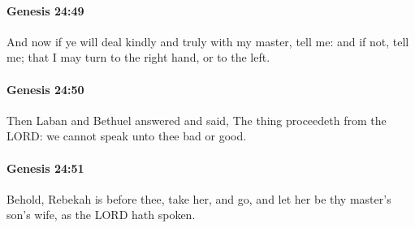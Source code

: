 		\paragraph{Genesis 24:49} %
			\label{GENESIS-24-49}

			And now if ye will deal kindly and truly with my master, tell me: and if not, tell me; that I may turn to the right hand, or to the left.


		\paragraph{Genesis 24:50} %
			\label{GENESIS-24-50}

			Then Laban and Bethuel answered and said, The thing proceedeth from the LORD: we cannot speak unto thee bad or good.


		\paragraph{Genesis 24:51} %
			\label{GENESIS-24-51}

			Behold, Rebekah is before thee, take her, and go, and let her be thy master's son's wife, as the LORD hath spoken.


